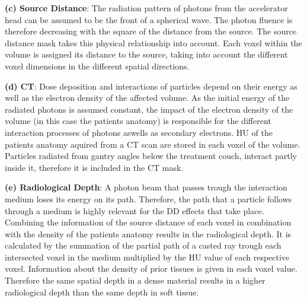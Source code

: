 \begin{hangingpar}
    \item \textbf{(c) Source Distance}: 
    The radiation pattern of photons from the accelerator head can be assumed to be the front of a spherical wave. 
    The photon fluence is therefore decreasing with the square of the distance from the source. 
    The source distance mask takes this physical relationship into account. 
    Each voxel within the volume is assigned its distance to the source, taking into account the different voxel dimensions in the different spatial directions. 
    
\end{hangingpar}

\begin{hangingpar}
    \item \textbf{(d) CT}: 
    Dose deposition and interactions of particles depend on their energy as well as the electron density of the affected volume. 
    As the initial energy of the radiated photons is assumed constant, the impact of the electron density of the volume (in this case the patients anatomy) is responsible for the different interaction processes of photons aswells as secondary electrons. 
    \ac{HU} of the patients anatomy aquired from a \ac{CT} scan are stored in each voxel of the volume. 
    Particles radiated from gantry angles below the treatment couch, interact partly inside it, therefore it is included in the \acs{CT} mask. 
\end{hangingpar}

\begin{hangingpar}\label{par:radiological_depth}
    \item \textbf{(e) Radiological Depth}: 
    A photon beam that passes trough the interaction medium loses its energy on its path. 
    Therefore, the path that a particle follows through a medium is highly relevant for the \acs{DD} effects that take place. 
    Combining the information of the source distance of each voxel in combination with the density of the patients anatomy results in the radiological depth.
    It is calculated by the summation of the partial path of a casted ray trough each intersected voxel in the medium multiplied by the \acs{HU} value of each respective voxel.
    Information about the density of prior tissues is given in each voxel value.
    Therefore the same spatial depth in a dense material results in a higher radiological depth than the same depth in soft tissue.
\end{hangingpar}

